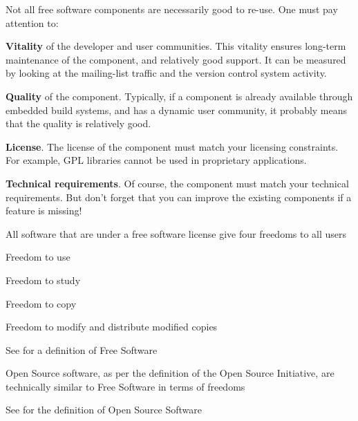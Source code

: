   \startitemize
  \item Not all free software components are necessarily good to
    re-use. One must pay attention to:
    \startitemize
    \item {\bf Vitality} of the developer and user communities. This
      vitality ensures long-term maintenance of the component, and
      relatively good support. It can be measured by looking at the
      mailing-list traffic and the version control system activity.
    \item {\bf Quality} of the component. Typically, if a component is
      already available through embedded build systems, and has a
      dynamic user community, it probably means that the quality is
      relatively good.
    \item {\bf License}. The license of the component must match your
      licensing constraints. For example, GPL libraries cannot be used
      in proprietary applications.
    \item {\bf Technical requirements}. Of course, the component must
      match your technical requirements. But don't forget that you can
      improve the existing components if a feature is missing!
    \stopitemize
  \stopitemize

  \startitemize
  \item All software that are under a free software license give four
    freedoms to all users
    \startitemize
    \item Freedom to use
    \item Freedom to study
    \item Freedom to copy
    \item Freedom to modify and distribute modified copies
    \stopitemize
  \item See  for a
    definition of Free Software
  \item Open Source software, as per the definition of the Open Source
    Initiative, are technically similar to Free Software in terms of
    freedoms
  \item See  for the definition of
    Open Source Software
  \stopitemize

